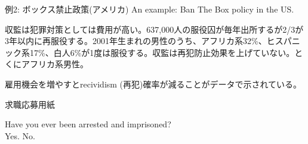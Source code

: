 \begin{frame}[t, label=BanTheBox1]{}
例2: ボックス禁止政策(アメリカ) An example: Ban The Box policy in the US.\\

\pause
\begin{description}[<+->]
\vspace{1.0ex}\setlength{\itemsep}{1.0ex}\setlength{\baselineskip}{12pt}
\item[背景] 収監は犯罪対策としては費用が高い。637,000人の服役囚が毎年出所するが2/3が3年以内に再服役する。2001年生まれの男性のうち、アフリカ系32\%、ヒスパニック系17\%、白人6\%が1度は服役する。収監は再犯防止効果を上げていない。とくにアフリカ系男性。
\item[雇用は効果あり]	雇用機会を増やすとrecividism (再犯)確率が減ることがデータで示されている。
\item[`The Box']	求職応募用紙\\
\vspace{1ex}
\begin{mdframed}[linecolor=blue!30,
  linewidth=.5pt,
  roundcorner=8pt
]
Have you ever been arrested and imprisoned? \\
 Yes.  No.
\end{mdframed}
\end{description}
\end{frame}


